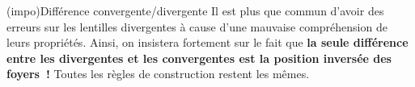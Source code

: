 \documentclass[../../main/main.tex]{subfiles}
\begin{document}
\begin{tcb*}[label=appl:lentfoy, sidebyside]
\begin{center}
{		}%
		\label{fig:convfp}
	\end{center}
	\tcblower
	\begin{center}
		\label{fig:divfp}
	\end{center}
\end{tcb*}

\begin{tcb*}(impo){Différence convergente/divergente}
	Il est plus que commun d'avoir des erreurs sur les lentilles divergentes à
	cause d'une mauvaise compréhension de leurs propriétés. Ainsi, on insistera
	fortement sur le fait que \textbf{la seule différence entre les divergentes et
		les convergentes est la position inversée des foyers~!} Toutes les règles de
	construction restent les mêmes.
\end{tcb*}
\end{document}
